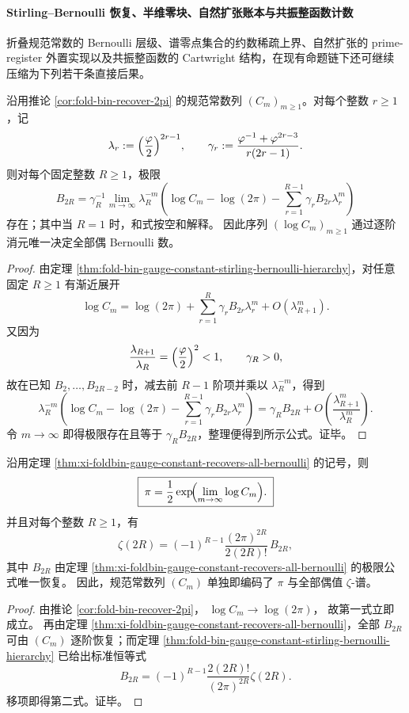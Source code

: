 \paragraph{Stirling--Bernoulli 恢复、半维零块、自然扩张账本与共振整函数计数}
折叠规范常数的 Bernoulli 层级、谱零点集合的约数稀疏上界、自然扩张的 prime-register 外置实现以及共振整函数的 Cartwright 结构，在现有命题链下还可继续压缩为下列若干条直接后果。

\begin{theorem}\label{thm:xi-foldbin-gauge-constant-recovers-all-bernoulli}
沿用推论 \ref{cor:fold-bin-recover-2pi} 的规范常数列 \((C_m)_{m\ge 1}\)。对每个整数 \(r\ge 1\)，记
\[
\lambda_r:=\Bigl(\frac{\varphi}{2}\Bigr)^{2r-1},
\qquad
\gamma_r:=\frac{\varphi^{-1}+\varphi^{2r-3}}{r(2r-1)}.
\]
则对每个固定整数 \(R\ge 1\)，极限
\[
\boxed{\;
B_{2R}
=
\gamma_R^{-1}
\lim_{m\to\infty}
\lambda_R^{-m}
\left(
\log C_m-\log(2\pi)-\sum_{r=1}^{R-1}\gamma_r B_{2r}\lambda_r^m
\right)\;}
\]
存在；其中当 \(R=1\) 时，和式按空和解释。
因此序列 \((\log C_m)_{m\ge 1}\) 通过逐阶消元唯一决定全部偶 Bernoulli 数。
\end{theorem}
\begin{proof}
由定理 \ref{thm:fold-bin-gauge-constant-stirling-bernoulli-hierarchy}，对任意固定 \(R\ge 1\) 有渐近展开
\[
\log C_m
=
\log(2\pi)+
\sum_{r=1}^{R}\gamma_r B_{2r}\lambda_r^m
+O(\lambda_{R+1}^m).
\]
又因为
\[
\frac{\lambda_{R+1}}{\lambda_R}
=
\Bigl(\frac{\varphi}{2}\Bigr)^2<1,
\qquad
\gamma_R>0,
\]
故在已知 \(B_2,\dots,B_{2R-2}\) 时，减去前 \(R-1\) 阶项并乘以 \(\lambda_R^{-m}\)，得到
\[
\lambda_R^{-m}
\left(
\log C_m-\log(2\pi)-\sum_{r=1}^{R-1}\gamma_r B_{2r}\lambda_r^m
\right)
=
\gamma_R B_{2R}+O\!\left(\frac{\lambda_{R+1}^m}{\lambda_R^m}\right).
\]
令 \(m\to\infty\) 即得极限存在且等于 \(\gamma_R B_{2R}\)，整理便得到所示公式。证毕。
\end{proof}

\begin{corollary}\label{cor:xi-foldbin-gauge-constant-recovers-pi-even-zeta}
沿用定理 \ref{thm:xi-foldbin-gauge-constant-recovers-all-bernoulli} 的记号，则
\[
\boxed{\;
\pi=\frac12\exp\!\Bigl(\lim_{m\to\infty}\log C_m\Bigr).\;}
\]
并且对每个整数 \(R\ge 1\)，有
\[
\boxed{\;
\zeta(2R)
=
(-1)^{R-1}\frac{(2\pi)^{2R}}{2(2R)!}\,B_{2R},\;}
\]
其中 \(B_{2R}\) 由定理 \ref{thm:xi-foldbin-gauge-constant-recovers-all-bernoulli} 的极限公式唯一恢复。
因此，规范常数列 \((C_m)\) 单独即编码了 \(\pi\) 与全部偶值 \(\zeta\)-谱。
\end{corollary}
\begin{proof}
由推论 \ref{cor:fold-bin-recover-2pi}，
\(
\log C_m\to\log(2\pi)
\)，
故第一式立即成立。
再由定理 \ref{thm:xi-foldbin-gauge-constant-recovers-all-bernoulli}，全部 \(B_{2R}\) 可由 \((C_m)\) 逐阶恢复；而定理 \ref{thm:fold-bin-gauge-constant-stirling-bernoulli-hierarchy} 已给出标准恒等式
\[
B_{2R}=(-1)^{R-1}\frac{2(2R)!}{(2\pi)^{2R}}\zeta(2R).
\]
移项即得第二式。证毕。
\end{proof}

